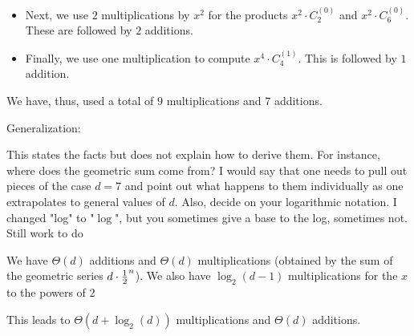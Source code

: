 \begin{itemize}
\begin{enumerate}
\begin{itemize}
\medskip\item
Next, we use $2$ multiplications by $x^2$ for the products $x^2 \cdot C_2^{(0)}$ and $x^2 \cdot C_6^{(0)}$.  These are followed by $2$ additions.

\medskip\item
Finally, we use one multiplication to compute $x^4 \cdot C_4^{(1)}$.  This is followed by $1$ addition.
\end{itemize}
We have, thus, used a total of $9$ multiplications and $7$ additions.

\medskip

Generalization: 

{\Arny This states the facts but does not explain how to derive them.  For instance, where does the geometric sum come from?  I would say that one needs to pull out pieces of the case $d=7$ and point out what happens to them individually as one extrapolates to general values of $d$.  Also, decide on your logarithmic notation.  I changed "log" to "$\log$", but you sometimes give a base to the log, sometimes not.  Still work to do}

We have $\Theta(d)$ additions and $\Theta(d)$ multiplications (obtained by the sum of the geometric series $d \cdot {{1} \over {2}}^n$). 
We also have $\log_2(d-1)$ multiplications for the $x$ to the powers of $2$

This leads to $\Theta(d + \log_2(d))$ multiplications and $\Theta(d)$ additions.
\end{enumerate}

\end{itemize}


